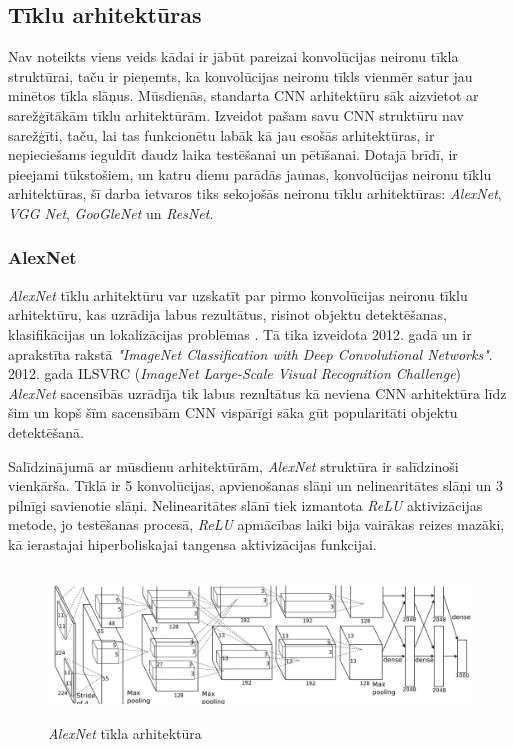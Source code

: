\subsection{Tīklu arhitektūras}
Nav noteikts viens veids kādai ir jābūt pareizai konvolūcijas neironu tīkla struktūrai, taču ir pieņemts, ka konvolūcijas neironu tīkls vienmēr satur jau minētos tīkla slāņus. Mūsdienās, standarta CNN arhitektūru sāk aizvietot ar sarežģītākām tīklu arhitektūrām. Izveidot pašam savu CNN struktūru nav sarežģīti, taču, lai tas funkcionētu labāk kā jau esošās arhitektūras, ir nepieciešams ieguldīt daudz laika testēšanai un pētīšanai. Dotajā brīdī, ir pieejami tūkstošiem, un katru dienu parādās jaunas, konvolūcijas neironu tīklu arhitektūras, šī darba ietvaros tiks sekojošās neironu tīklu arhitektūras: \textit{AlexNet}, \textit{VGG Net}, \textit{GooGleNet} un \textit{ResNet}.

\subsubsection{AlexNet}

\textit{AlexNet} tīklu arhitektūru var uzskatīt par pirmo konvolūcijas neironu tīklu arhitektūru, kas uzrādija labus rezultātus, risinot objektu detektēšanas, klasifikācijas un lokalizācijas problēmas \cite{ILSVRC15}. Tā tika izveidota 2012. gadā un ir aprakstīta rakstā \textit{"ImageNet Classification with Deep Convolutional Networks"}\cite{krizhevsky2012imagenet}. 2012. gada ILSVRC (\textit{ImageNet Large-Scale Visual Recognition Challenge}) \textit{AlexNet} sacensībās uzrādīja tik labus rezultātus kā neviena CNN arhitektūra līdz šim \cite{ILSVRC15} un kopš šīm sacensībām CNN vispārīgi sāka gūt popularitāti objektu detektēšanā. 

Salīdzinājumā ar mūsdienu arhitektūrām, \textit{AlexNet} struktūra ir salīdzinoši vienkārša. Tīklā ir 5 konvolūcijas, apvienošanas slāņi un nelinearitātes slāņi un 3 pilnīgi savienotie slāņi. Nelinearitātes slānī tiek izmantota \textit{ReLU} aktivizācijas metode, jo testēšanas procesā, \textit{ReLU} apmācības laiki bija vairākas reizes mazāki, kā ierastajai hiperboliskajai tangensa aktivizācijas funkcijai. 
\begin{figure}[h]%
	\centering
	\includegraphics[height=4cm]{images/alexnet.jpg} %
	\caption{\textit{AlexNet} tīkla arhitektūra \cite{alexnetimage}}%
	\label{fig:example}%
\end{figure}

